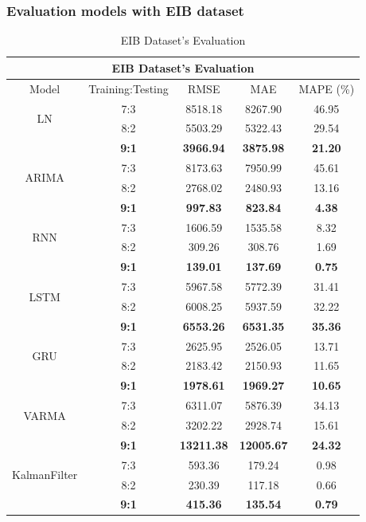 \subsubsection{Evaluation models with EIB dataset}
\begin{table}[H]
    \centering
    \caption{EIB Dataset's Evaluation}
    \begin{tabular}{|c|c|c|c|c|}
         \hline
         \multicolumn{5}{|c|}{\textbf{EIB Dataset's Evaluation}}\\
         \hline
         \centering Model & Training:Testing & RMSE & MAE & MAPE (\%)\\
         \hline
         \multirow{2}{*}{LN} & 7:3 & 8518.18&8267.90&46.95 \\ & 8:2 & 5503.29&5322.43&29.54 \\ & \textbf{9:1} & \textbf{3966.94} & \textbf{3875.98} & \textbf{21.20}\\
         \hline
         \multirow{2}{*}{ARIMA} & 7:3 & 8173.63&7950.99&45.61\\ & 8:2 & 2768.02&2480.93&13.16 \\ & \textbf{9:1} & \textbf{997.83} & \textbf{823.84} & \textbf{4.38}\\
         \hline
         \multirow{2}{*}{RNN} & 7:3 & 1606.59&1535.58&8.32\\ & 8:2 & 309.26&308.76&1.69 \\ & \textbf{9:1} & \textbf{139.01} & \textbf{137.69} & \textbf{0.75}\\
         \hline
         \multirow{2}{*}{LSTM} & 7:3 & 5967.58&5772.39&31.41\\ & 8:2 & 6008.25&5937.59&32.22 \\ & \textbf{9:1} & \textbf{6553.26} & \textbf{6531.35} & \textbf{35.36}\\
         \hline
         \multirow{2}{*}{GRU} & 7:3 & 2625.95&2526.05&13.71\\ & 8:2 & 2183.42&2150.93&11.65 \\ & \textbf{9:1} & \textbf{1978.61} & \textbf{1969.27} & \textbf{10.65}\\
         \hline
         \multirow{2}{*}{VARMA} & 7:3 & 6311.07&5876.39&34.13\\ & 8:2 & 3202.22&2928.74&15.61\\ & \textbf{9:1} & \textbf{13211.38} & \textbf{12005.67} & \textbf{24.32}\\       
         \hline
         \multirow{2}{*}{KalmanFilter} & 7:3 & 593.36&179.24&0.98\\ & 8:2 & 230.39&117.18&0.66 \\ & \textbf{9:1} & \textbf{415.36} & \textbf{135.54} & \textbf{0.79}\\

\end{tabular}
\end{table}
